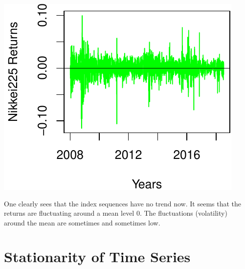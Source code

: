 \documentclass[11pt,]{article}
\newenvironment{Shaded}{\begin{snugshade}}{\end{snugshade}}
\newcommand{\KeywordTok}[1]{\textcolor[rgb]{0.13,0.29,0.53}{\textbf{#1}}}
\newcommand{\DataTypeTok}[1]{\textcolor[rgb]{0.13,0.29,0.53}{#1}}
\newcommand{\DecValTok}[1]{\textcolor[rgb]{0.00,0.00,0.81}{#1}}
\newcommand{\FloatTok}[1]{\textcolor[rgb]{0.00,0.00,0.81}{#1}}
\newcommand{\StringTok}[1]{\textcolor[rgb]{0.31,0.60,0.02}{#1}}
\newcommand{\CommentTok}[1]{\textcolor[rgb]{0.56,0.35,0.01}{\textit{#1}}}
\newcommand{\OperatorTok}[1]{\textcolor[rgb]{0.81,0.36,0.00}{\textbf{#1}}}
\newcommand{\NormalTok}[1]{#1}
\begin{document}
\begin{Shaded}
\end{Shaded}

\begin{center}\includegraphics{FMC_T4_PhD_Fin_Time_Series_files/figure-latex/return_market_index_func-2} \end{center}

One clearly sees that the index sequences have no trend now. It seems
that the returns are fluctuating around a mean level 0. The fluctuations
(volatility) around the mean are sometimes and sometimes low.

\section{Stationarity of Time Series}\label{stationarity-of-time-series}
\end{document}
